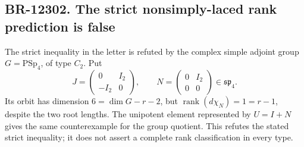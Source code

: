 \documentclass[11pt,a4paper]{article}
\theoremstyle{definition}\newtheorem{definition}[theorem]{Definition}
\theoremstyle{remark}\newtheorem{remark}[theorem]{Remark}
\begin{document}
\subsection{BR-12302. The strict nonsimply-laced rank prediction is false}
The strict inequality in the letter is refuted by the
complex simple adjoint group \(G=\mathrm{PSp}_4\), of type
\(C_2\). Put
\[
 J=\begin{pmatrix}0&I_2\\-I_2&0\end{pmatrix},\qquad
 N=\begin{pmatrix}0&I_2\\0&0\end{pmatrix}
       \in\mathfrak{sp}_4.
\]
Its orbit has dimension \(6=\dim G-r-2\), but
\(\operatorname{rank}(d\chi_N)=1=r-1\), despite the two
root lengths. The unipotent element represented by \(U=I+N\)
gives the same counterexample for the group quotient.
This refutes the stated strict inequality;
it does not assert a complete rank classification in every type.
\end{document}

